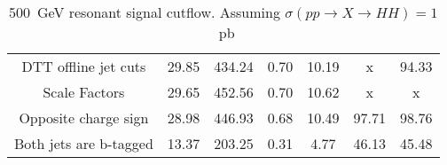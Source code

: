 \begin{landscape}
\begin{table}
\begin{tabular}{|c|cc|cc|cc|}
DTT offline jet cuts & 29.85 & 434.24 & 0.70 & 10.19 & x     & 94.33  \\
Scale Factors & 29.65 & 452.56 & 0.70 & 10.62 & x     & x \\
Opposite charge sign & 28.98 & 446.93 & 0.68 & 10.49 & 97.71 & 98.76  \\
Both jets are b-tagged & 13.37 & 203.25 & 0.31 & 4.77  & 46.13 & 45.48  \\
\hline
\end{tabular}
\caption{500~GeV resonant \hadhad signal cutflow. Assuming $\sigma(pp\rightarrow X\rightarrow HH)=1$~pb}
\label{tab:X500_hadhad_cutflow}
\end{table}
\end{landscape}


\begin{landscape}
\begin{table}
\centering


\end{table}
\end{landscape}
